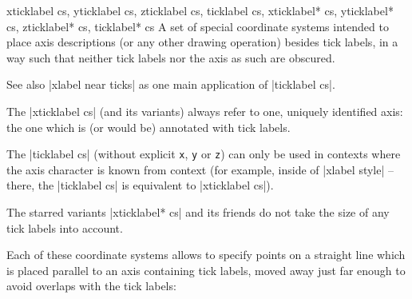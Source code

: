 \begin{coordinatesystemlist}{%
    xticklabel cs,
    yticklabel cs,
    zticklabel cs,
    ticklabel cs,
    xticklabel* cs,
    yticklabel* cs,
    zticklabel* cs,
    ticklabel* cs%
}
    A set of special coordinate systems intended to place axis descriptions (or
    any other drawing operation) besides tick labels, in a way such that
    neither tick labels nor the axis as such are obscured.

    See also |xlabel near ticks| as one main application of |ticklabel cs|.

    The |xticklabel cs| (and its variants) always refer to one, uniquely
    identified axis: the one which is (or would be) annotated with tick labels.

    The |ticklabel cs| (without explicit \texttt{x}, \texttt{y} or \texttt{z})
    can only be used in contexts where the axis character is known from context
    (for example, inside of |xlabel style| -- there, the |ticklabel cs| is
    equivalent to |xticklabel cs|).

    The starred variants |xticklabel* cs| and its friends do not take the size
    of any tick labels into account.

    Each of these coordinate systems allows to specify points on a straight
    line which is placed parallel to an axis containing tick labels, moved away
    just far enough to avoid overlaps with the tick labels:
\begin{codeexample}[width=4cm]
\end{codeexample}


\end{coordinatesystemlist}
